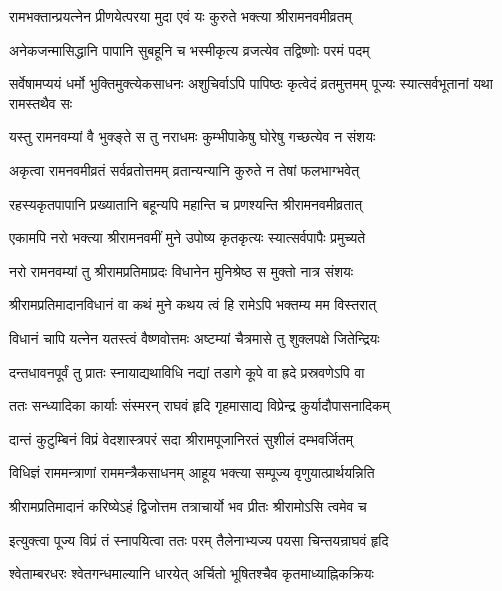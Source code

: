 \twolineshloka
{रामभक्तान्प्रयत्नेन प्रीणयेत्परया मुदा}
{एवं यः कुरुते भक्त्या श्रीरामनवमीव्रतम्}%

\twolineshloka
{अनेकजन्मासिद्धानि पापानि सुबहूनि च}
{भस्मीकृत्य व्रजत्येव तद्विष्णोः परमं पदम्}%

\threelineshloka
{सर्वेषामप्ययं धर्मो भुक्तिमुक्त्येकसाधनः}
{अशुचिर्वाऽपि पापिष्ठः कृत्वेदं व्रतमुत्तमम्}
{पूज्यः स्यात्सर्वभूतानां यथा रामस्तथैव सः}%

\twolineshloka
{यस्तु रामनवम्यां वै भुक्ङ्ते स तु नराधमः}
{कुम्भीपाकेषु घोरेषु गच्छत्येव न संशयः}%

\twolineshloka
{अकृत्वा रामनवमीव्रतं सर्वव्रतोत्तमम्}
{व्रतान्यन्यानि कुरुते न तेषां फलभाग्भवेत्}%

\twolineshloka
{रहस्यकृतपापानि प्रख्यातानि बहून्यपि}
{महान्ति च प्रणश्यन्ति श्रीरामनवमीव्रतात्}%

\twolineshloka
{एकामपि नरो भक्त्या श्रीरामनवमीं मुने}
{उपोष्य कृतकृत्यः स्यात्सर्वपापैः प्रमुच्यते}%

\twolineshloka
{नरो रामनवम्यां तु श्रीरामप्रतिमाप्रदः}
{विधानेन मुनिश्रेष्ठ स मुक्तो नात्र संशयः}%

\twolineshloka
{श्रीरामप्रतिमादानविधानं वा कथं मुने}
{कथय त्वं हि रामेऽपि भक्तम्य मम विस्तरात्}%


\twolineshloka
{विधानं चापि यत्नेन यतस्त्वं वैष्णवोत्तमः}
{अष्टम्यां चैत्रमासे तु शुक्लपक्षे जितेन्द्रियः}%

\twolineshloka
{दन्तधावनपूर्वं तु प्रातः स्नायाद्यथाविधि}
{नद्यां तडागे कूपे वा ह्रदे प्रस्रवणेऽपि वा}%

\twolineshloka
{ततः सन्ध्यादिका कार्याः संस्मरन् राघवं हृदि}
{गृहमासाद्य विप्रेन्द्र कुर्यादौपासनादिकम्}%

\twolineshloka
{दान्तं कुटुम्बिनं विप्रं वेदशास्त्रपरं सदा}
{श्रीरामपूजानिरतं सुशीलं दम्भवर्जितम्}%

\twolineshloka
{विधिज्ञं राममन्त्राणां राममन्त्रैकसाधनम्}
{आहूय भक्त्या सम्पूज्य वृणुयात्प्रार्थयन्निति}%

\twolineshloka
{श्रीरामप्रतिमादानं करिष्येऽहं द्विजोत्तम}
{तत्राचार्यो भव प्रीतः श्रीरामोऽसि त्वमेव च}%

\twolineshloka
{इत्युक्त्वा पूज्य विप्रं तं स्नापयित्वा ततः परम्}
{तैलेनाभ्यज्य पयसा चिन्तयन्राघवं हृदि}%

\twolineshloka
{श्वेताम्बरधरः श्वेतगन्धमाल्यानि धारयेत्}
{अर्चितो भूषितश्चैव कृतमाध्याह्निकक्रियः}%

